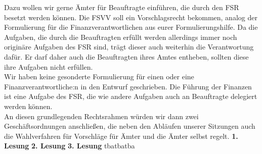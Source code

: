 {        Dazu wollen wir gerne Ämter für Beauftragte einführen, die durch den FSR besetzt werden können. Die FSVV soll ein
        Vorschlagsrecht bekommen, analog der Formulierung für die Finanzverantwortlichen aus eurer Formulierungshilfe.
        Da die Aufgaben, die durch die Beauftragten erfüllt werden allerdings immer noch originäre Aufgaben des FSR sind,
        trägt dieser auch weiterhin die Verantwortung dafür. Er darf daher auch die Beauftragten ihres Amtes entheben,
        sollten diese ihre Aufgaben nicht erfüllen.\\
        Wir haben keine gesonderte Formulierung für einen oder eine Finanzverantwortliche:n in den Entwurf geschrieben.
        Die Führung der Finanzen ist eine Aufgabe des FSR, die wie andere Aufgaben auch an Beauftragte delegiert werden können.\\
        An diesen grundlegenden Rechtsrahmen würden wir dann zwei Geschäftsordnungen anschließen,
        die neben den Abläufen unserer Sitzungen auch die Wahlverfahren für Vorschläge für Ämter und die Ämter selbst regelt.
    }{
        \textbf{1. Lesung}
        \ul{}
        \textbf{2. Lesung}
        \ul{}
        \textbf{3. Lesung}
        \ul{}
    }{tba}{tba}{tba}
    
